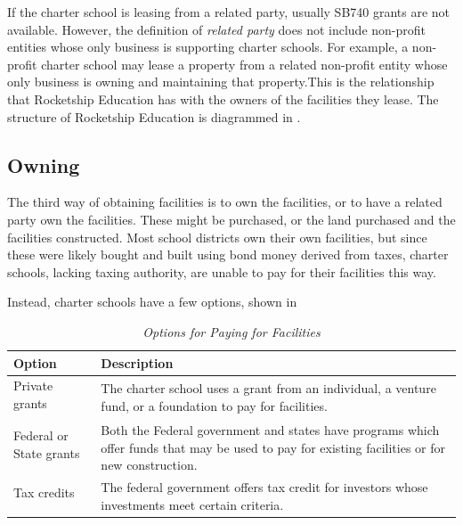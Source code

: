 If the charter school is leasing from a related party, usually SB740 grants are not available. However, the definition of \emph{related party} does not include non-profit entities whose only business is supporting charter schools. For example, a non-profit charter school may lease a property from a related non-profit entity whose only business is owning and maintaining that property.This is the relationship that Rocketship Education has with the owners of the facilities they lease. The structure of Rocketship Education is diagrammed in .

\subsection{Owning}\label{sec:owning}\indent

The third way of obtaining facilities is to own the facilities, or to have a related party own the facilities. These might be purchased, or the land purchased and the facilities constructed. Most school districts own their own facilities, but since these were likely bought and built using bond money derived from taxes, charter schools, lacking taxing authority, are unable to pay for their facilities this way.

Instead, charter schools have a few options, shown in

\begin{table}[ht]
  \small%
  \caption[Options for Paying for Facilities]{\textit{Options for Paying for Facilities}}\label{tab:paying-for-facilities}%
  \begin{tabular}{ll}
    \toprule%
    Option    & Description \\
    \midrule%
    Private grants & \multirow[t]{2}{4.75in}{The charter school uses a grant from an individual, a venture fund, or a foundation to pay for facilities.}\\\\
    Federal or State grants & \multirow[t]{2}{4.75in}{Both the Federal government and states have programs which offer funds that may be used to pay for existing facilities or for new construction.}\\\\
    Tax credits & \multirow[t]{2}{4.75in}{The federal government offers tax credit for investors whose investments meet certain criteria.}\\\\
    \bottomrule%
  \end{tabular}
\end{table}

